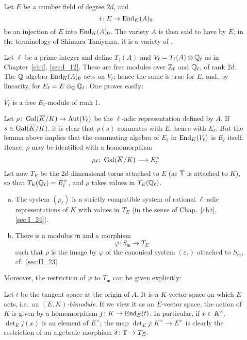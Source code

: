 Let $E$ be a number field of degree $2d$, and
\dpage
\[
	i \colon E \to \operatorname{End}_K(A)_0
\]
be an injection of $E$ into $\operatorname{End}_K(A)_0$. The variety $A$ is then said to
have  by $E$; in the terminology of
Shimura-Taniyama, it is a variety of .

Let $\ell$ be a prime integer and define $T_\ell(A)$ and $V_\ell = T_\ell(A)
\otimes \mathbb{Q}_\ell$ as in Chapter~\ref{ch:i}, \ref{sec:I_12}. These are free
modules over $\mathbb{Z}_\ell$ and $\mathbb{Q}_\ell$, of rank $2d$. The $\mathbb{Q}$-algebra
$\operatorname{End}_K(A)_0$ acts on $V_\ell$; hence the same is true for $E$, and, by
linearity, for $E_\ell = E \otimes_{\mathbb{Q}} \mathbb{Q}_\ell$. One proves easily:

\begin{lem}
	$V_\ell$ is a free $E_\ell$-module of rank 1.
\end{lem}

Let $\rho\colon \operatorname{Gal}(\overline{K}/K) \to \operatorname{Aut}(V_\ell)$ be the $\ell$-adic
representation defined by $A$. If $s \in \operatorname{Gal}(\overline{K}/K)$, it is clear that
$\rho(s)$ commutes with $E$, hence with $E_\ell$. But the lemma above implies
that the commuting algebra of $E_\ell$ in $\operatorname{End}_K(V_\ell)$ is $E_\ell$ itself.
Hence, $\rho$ may be identified with a homomorphism
\[
	\rho_\ell\colon \operatorname{Gal}(\overline{K}/K) \longrightarrow E^\times_\ell
\]
Let now $T_E$ be the $2d$-dimensional torus attached to $E$ (as $\mathbb{T}$ is
attached to $K$), so that $T_E(\mathbb{Q}_\ell) = E_\ell^\times$, and $\rho$ takes
values in $T_E(\mathbb{Q}_\ell)$.

\begin{thm}\label{thm:II_28_1}
\begin{enumerate}[(a)]
\item\label{thm:II_28_1a}
	The system $(\rho_\ell)$ is a strictly compatible system of rational
	$\ell$-adic representations of $K$ with values in $T_E$ (in the sense
	\dpage
	of Chap.~\ref{ch:i}, \ref{sec:I_24}).
\item\label{thm:II_28_1b}
	There is a modulus $\mathfrak{m}$ and a morphism
	\[
		\varphi \colon S_{\mathfrak{m}} \longrightarrow T_E
	\]
	such that $\rho$ is the image by $\varphi$ of the canonical system
	$(\varepsilon_\ell)$ attached to $S_{\mathfrak{m}}$, cf.\ 
	\ref{sec:II_23}.
\end{enumerate}
\end{thm}

Moreover, the restriction of $\varphi$ to $T_{\mathfrak{m}}$ can be given
explicitly:

Let $t$ be the tangent space at the origin of $A$. It is a $K$-vector space on
which $E$ acts, i.e.\ an \emph{$(E, K)$-bimodule}. If we view it as an
$E$-vector space, the action of $K$ is given by a homomorphism $j\colon K \to
\operatorname{End}_E(t)$. In particular, if $x \in K^\times$, $\det_E j(x)$ is an element of
$E^\times$; the map $\det_E j\colon K^\times \to E^\times$ is clearly the
restriction of an algebraic morphism $\delta\colon \mathbb{T} \to T_E$.

